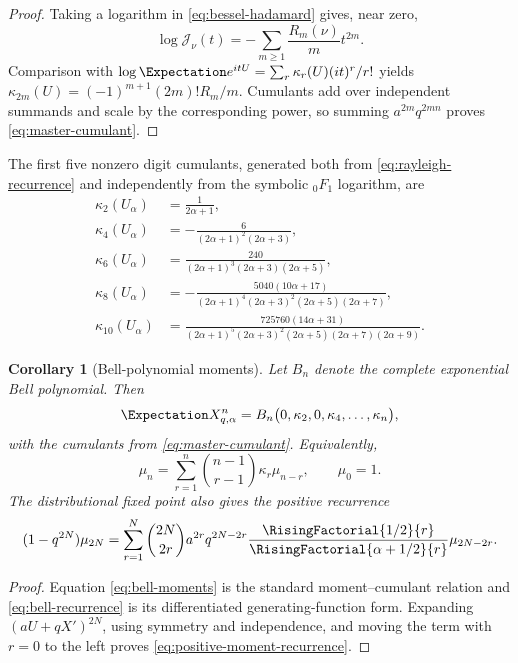 \documentclass[11pt]{article}
\newtheorem{corollary}[theorem]{Corollary}
\theoremstyle{definition}
\theoremstyle{remark}
\newcommand{\Jcal}{\mathcal{J}}
\begin{document}
\begin{proof}
Taking a logarithm in \eqref{eq:bessel-hadamard} gives, near zero,
\[
 \log\Jcal_\nu(t)=-\sum_{m\ge1}\frac{R_m(\nu)}m t^{2m}.
\]
Comparison with
\(\log\Expectation e^{itU}=\sum_r\kappa_r(U)(it)^r/r!\) yields
\(\kappa_{2m}(U)=(-1)^{m+1}(2m)!R_m/m\).  Cumulants add over independent
summands and scale by the corresponding power, so summing
\(a^{2m}q^{2mn}\) proves \eqref{eq:master-cumulant}.
\end{proof}

The first five nonzero digit cumulants, generated both from
\eqref{eq:rayleigh-recurrence} and independently from the symbolic
\({}_0F_1\) logarithm, are
\begin{align}
 \kappa_2(U_\alpha)&=\frac1{2\alpha+1},\label{eq:k2}\\
 \kappa_4(U_\alpha)&=-\frac6{(2\alpha+1)^2(2\alpha+3)},\label{eq:k4}\\
 \kappa_6(U_\alpha)&=\frac{240}
 {(2\alpha+1)^3(2\alpha+3)(2\alpha+5)},\label{eq:k6}\\
 \kappa_8(U_\alpha)&=-\frac{5040(10\alpha+17)}
 {(2\alpha+1)^4(2\alpha+3)^2(2\alpha+5)(2\alpha+7)},\label{eq:k8}\\
 \kappa_{10}(U_\alpha)&=\frac{725760(14\alpha+31)}
 {(2\alpha+1)^5(2\alpha+3)^2(2\alpha+5)(2\alpha+7)(2\alpha+9)}.
 \label{eq:k10}
\end{align}

\begin{corollary}[Bell-polynomial moments]
\label{cor:bell-moments}
Let \(B_n\) denote the complete exponential Bell polynomial.  Then
\begin{equation}
 \Expectation X_{q,\alpha}^n
 =B_n\bigl(0,\kappa_2,0,\kappa_4,\ldots,\kappa_n\bigr),
 \label{eq:bell-moments}
\end{equation}
with the cumulants from \eqref{eq:master-cumulant}.  Equivalently,
\begin{equation}
 \mu_n=\sum_{r=1}^{n}\binom{n-1}{r-1}\kappa_r\mu_{n-r},
 \qquad \mu_0=1.
 \label{eq:bell-recurrence}
\end{equation}
The distributional fixed point also gives the positive recurrence
\begin{equation}
 (1-q^{2N})\mu_{2N}
 =\sum_{r=1}^{N}\binom{2N}{2r}
 a^{2r}q^{2N-2r}
 \frac{\RisingFactorial{1/2}{r}}{\RisingFactorial{\alpha+1/2}{r}}
 \mu_{2N-2r}.
 \label{eq:positive-moment-recurrence}
\end{equation}
\end{corollary}

\begin{proof}
Equation \eqref{eq:bell-moments} is the standard moment--cumulant relation and
\eqref{eq:bell-recurrence} is its differentiated generating-function form.
Expanding \((aU+qX')^{2N}\), using symmetry and independence, and moving the
term with \(r=0\) to the left proves \eqref{eq:positive-moment-recurrence}.
\end{proof}
\end{document}
